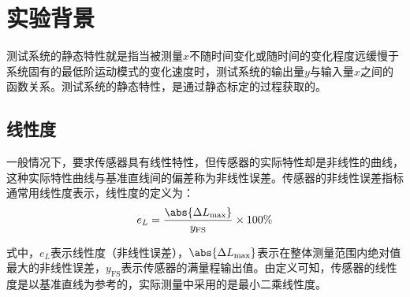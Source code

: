 \documentclass[a4paper,12pt,twoside]{article}%
\begin{document}




\setcounter{page}{1}

\section{实验背景}
测试系统的静态特性就是指当被测量$x$不随时间变化或随时间的变化程度远缓慢于系统固有的最低阶运动模式的变化速度时，测试系统的输出量$y$与输入量$x$之间的函数关系。测试系统的静态特性，是通过静态标定的过程获取的。
\subsection{线性度}
一般情况下，要求传感器具有线性特性，但传感器的实际特性却是非线性的曲线，这种实际特性曲线与基准直线间的偏差称为非线性误差。传感器的非线性误差指标通常用线性度表示，线性度的定义为：
\begin{equation}
  e_L= \frac{\abs{\Delta L_\mathrm{max}}}{y_\mathrm{FS}} \times 100\%
  \label{eq:linearity}
\end{equation}\par
式中，$e_L$表示线性度（非线性误差），$\abs{\Delta L_\mathrm{max}}$表示在整体测量范围内绝对值最大的非线性误差，$y_\mathrm{FS}$表示传感器的满量程输出值。由定义可知，传感器的线性度是以基准直线为参考的，实际测量中采用的是最小二乘线性度。
\end{document}
